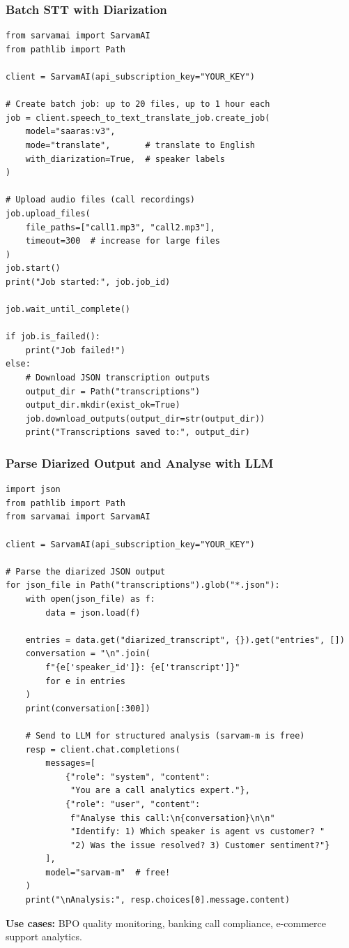 \begin{frame}[fragile]\frametitle{Batch STT with Diarization}
\begin{lstlisting}
from sarvamai import SarvamAI
from pathlib import Path

client = SarvamAI(api_subscription_key="YOUR_KEY")

# Create batch job: up to 20 files, up to 1 hour each
job = client.speech_to_text_translate_job.create_job(
    model="saaras:v3",
    mode="translate",       # translate to English
    with_diarization=True,  # speaker labels
)

# Upload audio files (call recordings)
job.upload_files(
    file_paths=["call1.mp3", "call2.mp3"],
    timeout=300  # increase for large files
)
job.start()
print("Job started:", job.job_id)

job.wait_until_complete()

if job.is_failed():
    print("Job failed!")
else:
    # Download JSON transcription outputs
    output_dir = Path("transcriptions")
    output_dir.mkdir(exist_ok=True)
    job.download_outputs(output_dir=str(output_dir))
    print("Transcriptions saved to:", output_dir)
\end{lstlisting}
\end{frame}

\begin{frame}[fragile]\frametitle{Parse Diarized Output and Analyse with LLM}
\begin{lstlisting}
import json
from pathlib import Path
from sarvamai import SarvamAI

client = SarvamAI(api_subscription_key="YOUR_KEY")

# Parse the diarized JSON output
for json_file in Path("transcriptions").glob("*.json"):
    with open(json_file) as f:
        data = json.load(f)

    entries = data.get("diarized_transcript", {}).get("entries", [])
    conversation = "\n".join(
        f"{e['speaker_id']}: {e['transcript']}"
        for e in entries
    )
    print(conversation[:300])

    # Send to LLM for structured analysis (sarvam-m is free)
    resp = client.chat.completions(
        messages=[
            {"role": "system", "content":
             "You are a call analytics expert."},
            {"role": "user", "content":
             f"Analyse this call:\n{conversation}\n\n"
             "Identify: 1) Which speaker is agent vs customer? "
             "2) Was the issue resolved? 3) Customer sentiment?"}
        ],
        model="sarvam-m"  # free!
    )
    print("\nAnalysis:", resp.choices[0].message.content)
\end{lstlisting}
\textbf{Use cases:} BPO quality monitoring, banking call compliance, e-commerce support analytics.
\end{frame}


